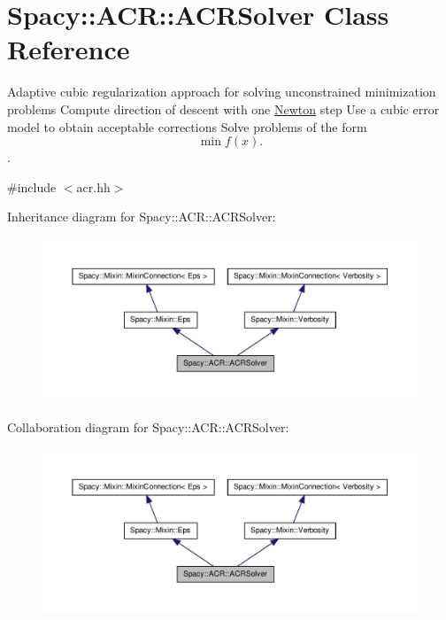 \hypertarget{classSpacy_1_1ACR_1_1ACRSolver}{\section{\-Spacy\-:\-:\-A\-C\-R\-:\-:\-A\-C\-R\-Solver \-Class \-Reference}
\label{classSpacy_1_1ACR_1_1ACRSolver}
}


\-Adaptive cubic regularization approach for solving unconstrained minimization problems \-Compute direction of descent with one \hyperlink{namespaceSpacy_1_1Newton}{\-Newton} step \-Use a cubic error model to obtain acceptable corrections \-Solve problems of the form \[\min f(x).\].  




{\ttfamily \#include $<$acr.\-hh$>$}



\-Inheritance diagram for \-Spacy\-:\-:\-A\-C\-R\-:\-:\-A\-C\-R\-Solver\-:
\nopagebreak
\begin{figure}[H]
\begin{center}
\leavevmode
\includegraphics[width=350pt]{classSpacy_1_1ACR_1_1ACRSolver__inherit__graph}
\end{center}
\end{figure}


\-Collaboration diagram for \-Spacy\-:\-:\-A\-C\-R\-:\-:\-A\-C\-R\-Solver\-:
\nopagebreak
\begin{figure}[H]
\begin{center}
\leavevmode
\includegraphics[width=350pt]{classSpacy_1_1ACR_1_1ACRSolver__coll__graph}
\end{center}
\end{figure}
